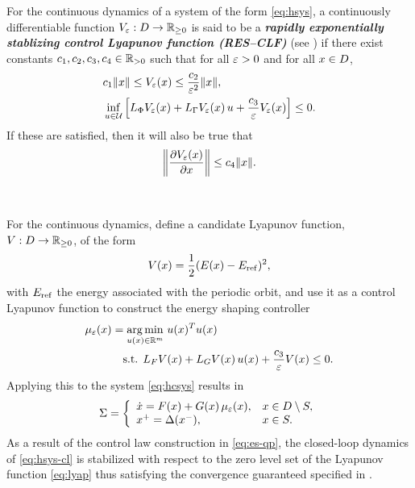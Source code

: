 \begin{definition}
  \label{def:res-clf}
  For the continuous dynamics of a system of the form \eqref{eq:hsys}, a continuously differentiable function $V_{\varepsilon} : D \to \mathbb{R}_{\geq 0}$ is said to be a {\bf \em rapidly exponentially stablizing control Lyapunov function (RES--CLF)} (see \cite{Ames2014}) if there exist constants $c_{1}, c_{2}, c_{3}, c_{4} \in \mathbb{R}_{> 0}$ such that for all $\varepsilon > 0$ and for all $x \in D$,
  \begin{eqnarray}
    &c_{1} \|x\| \leq V_{\varepsilon}(x) \leq \frac{c_{2}}{\varepsilon^{2}} \|x\|,\\
    \nonumber
    &\inf_{u \in \mathcal{U}} \left[ L_{\Phi} V_{\varepsilon}(x) + L_{\Gamma} V_{\varepsilon}(x) \, u + \frac{c_{3}}{\varepsilon} V_{\varepsilon}(x) \right] \leq 0.
  \end{eqnarray}
  If these are satisfied, then it will also be true that
  \begin{align}
    \label{eq:dVedx-bounds}
    \left\| \frac{\partial{V_{\varepsilon}(x)}}{\partial{x}} \right\| \leq c_{4} \|x\|.
  \end{align}
\end{definition}
\


For the continuous dynamics, define a candidate Lyapunov function, $V : D \to \mathbb{R}_{\geq 0}$, of the form
%
\begin{align}
  \label{eq:lyap}
  V(x) = \frac{1}{2} (E(x) - E_{\mathrm{ref}})^2,
\end{align}
%
with $E_{\mathrm{ref}}$ the energy associated with the periodic orbit, and use it as a control Lyapunov function to construct the energy shaping controller
%
\begin{align}
  \label{eq:es-qp}
  \mu_{\varepsilon}(x) = \operatorname*{arg\,min}_{u(x) \in \mathbb{R}^{m}} \ & u(x)^T u(x)\\
  \nonumber
  \mbox{s.t. } L_{F} V&(x) + L_{G} V(x) \, u(x) + \frac{c_{3}}{\varepsilon} V(x) \leq 0.
\end{align}
%
Applying this to the system \eqref{eq:hcsys} results in
%
\begin{align}
  \label{eq:hsys-cl}
  \Sigma = \left\{
  \begin{array}{l l}
    {\dot {x}} = F(x) + G(x) \, \mu_{\varepsilon}(x), & x \in D \setminus S,\\
    x^{+} = \Delta(x^{-}), &x \in S.
  \end{array}\right.
\end{align}
%
As a result of the control law construction in \eqref{eq:es-qp}, the closed-loop dynamics of \eqref{eq:hsys-cl} is stabilized with respect to the zero level set of the Lyapunov function \eqref{eq:lyap} thus satisfying the convergence guaranteed specified in .

